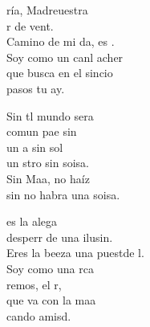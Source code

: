 \begin{cancion}%
	ría, Madreuestra\\
	r de vent.\\
	Camino de mi da,  es . \\
	Soy como un canl acher\\
	que busca en el sincio\\
	 pasos  tu ay. \jump\\
	\begin{chorus}%
		Sin tl mundo sera\\
		comun pae sin \\
		un a sin sol\\
		un stro sin soisa.\\
		Sin Maa, no haíz\\
		sin no habra una soisa.\jump\\
	\end{chorus}%
	es la alega \\
	desperr de una ilusin.\\
	Eres la beeza una puestde l.\\
	\jump
	Soy como una rca\\
	 remos,  el r,\\
	que va con la maa\\
	cando  amisd.\\
\end{cancion}%
